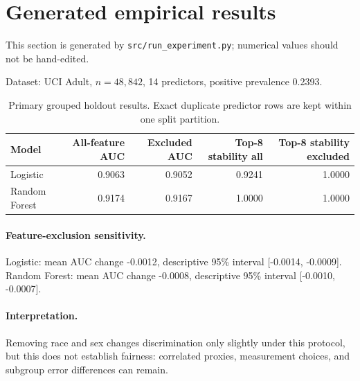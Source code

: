 \section{Generated empirical results}
This section is generated by \texttt{src/run\_experiment.py}; numerical values should not be hand-edited.

Dataset: UCI Adult, $n=48,842$, 14 predictors, positive prevalence 0.2393.

\begin{table}[htbp]
\centering
\small
\begin{tabular}{lrrrr}
\toprule
Model & All-feature AUC & Excluded AUC & Top-8 stability all & Top-8 stability excluded \\
\midrule
Logistic & 0.9063 & 0.9052 & 0.9241 & 1.0000 \\
Random Forest & 0.9174 & 0.9167 & 1.0000 & 1.0000 \\
\bottomrule
\end{tabular}
\caption{Primary grouped holdout results. Exact duplicate predictor rows are kept within one split partition.}
\label{tab:primary-results}
\end{table}

\paragraph{Feature-exclusion sensitivity.}
Logistic: mean AUC change -0.0012, descriptive 95\% interval [-0.0014, -0.0009].
Random Forest: mean AUC change -0.0008, descriptive 95\% interval [-0.0010, -0.0007].

\paragraph{Interpretation.}
Removing race and sex changes discrimination only slightly under this protocol, but this does not establish fairness: correlated proxies, measurement choices, and subgroup error differences can remain.
